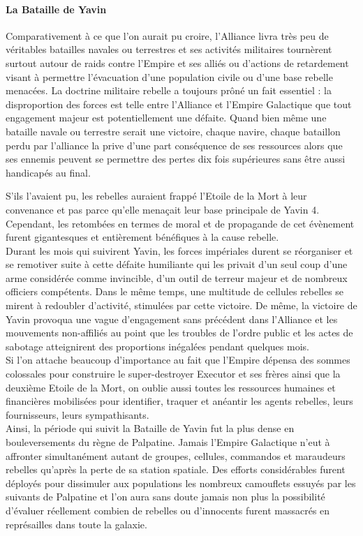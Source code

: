 \documentclass[twoside]{article}
\begin{document}
\paragraph{La Bataille de Yavin}
Comparativement à ce que l'on aurait pu croire, l'Alliance livra très peu de véritables batailles navales ou terrestres et ses activités militaires tournèrent surtout autour de raids contre l'Empire et ses alliés ou d'actions de retardement visant à permettre l'évacuation d'une population civile ou d'une base rebelle menacées. La doctrine militaire rebelle a toujours prôné un fait essentiel : la disproportion des forces est telle entre l'Alliance et l'Empire Galactique que tout engagement majeur est potentiellement une défaite. Quand bien même une bataille navale ou terrestre serait une victoire, chaque navire, chaque bataillon perdu par l'alliance la prive d'une part conséquence de ses ressources alors que ses ennemis peuvent se permettre des pertes dix fois supérieures sans être aussi handicapés au final.

S'ils l'avaient pu, les rebelles auraient frappé l'Etoile de la Mort à leur convenance et pas parce qu'elle menaçait leur base principale de Yavin 4. Cependant, les retombées en termes de moral et de propagande de cet évènement furent gigantesques et entièrement bénéfiques à la cause rebelle.\\

Durant les mois qui suivirent Yavin, les forces impériales durent se réorganiser et se remotiver suite à cette défaite humiliante qui les privait d'un seul coup d'une arme considérée comme invincible, d'un outil de terreur majeur et de nombreux officiers compétents. Dans le même temps, une multitude de cellules rebelles se mirent à redoubler d'activité, stimulées par cette victoire. De même, la victoire de Yavin provoqua une vague d'engagement sans précédent dans l'Alliance et les mouvements non-affiliés au point que les troubles de l'ordre public et les actes de sabotage atteignirent des proportions inégalées pendant quelques mois.\\

Si l'on attache beaucoup d'importance au fait que l'Empire dépensa des sommes colossales pour construire le super-destroyer Executor et ses frères ainsi que la deuxième Etoile de la Mort, on oublie aussi toutes les ressources humaines et financières mobilisées pour identifier, traquer et anéantir les agents rebelles, leurs fournisseurs, leurs sympathisants.\\

Ainsi, la période qui suivit la Bataille de Yavin fut la plus dense en bouleversements du règne de Palpatine. Jamais l'Empire Galactique n'eut à affronter simultanément autant de groupes, cellules, commandos et maraudeurs rebelles qu'après la perte de sa station spatiale. Des efforts considérables furent déployés pour dissimuler aux populations les nombreux camouflets essuyés par les suivants de Palpatine et l'on aura sans doute jamais non plus la possibilité d'évaluer réellement combien de rebelles ou d'innocents furent massacrés en représailles dans toute la galaxie.\\
\end{document}
